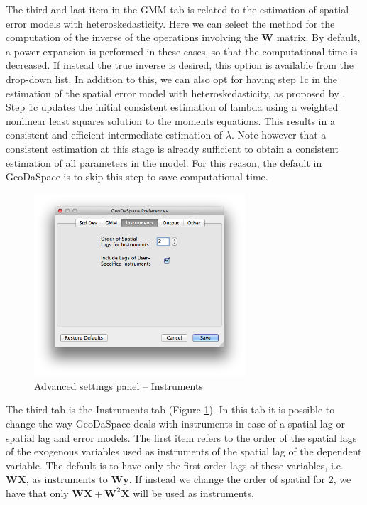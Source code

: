 \documentclass{article}
\begin{document}
The third and last item in the GMM tab is related to the estimation of spatial error models with heteroskedasticity. Here we can select the method for the computation of the inverse of the operations involving the $\mathbf{W}$ matrix. By default, a power expansion is performed in these cases, so that the computational time is decreased. If instead the true inverse is desired, this option is available from the drop-down list. In addition to this, we can also opt for having step 1c in the estimation of the spatial error model with heteroskedasticity, as proposed by \citet{Arraiz10}. Step 1c updates the initial consistent estimation of lambda using a weighted nonlinear least squares solution to the moments equations. This results in a consistent and efficient intermediate estimation of $\lambda$. Note however that a consistent estimation at this stage is already sufficient to obtain a consistent estimation of all parameters in the model. For this reason, the default in GeoDaSpace is to skip this step to save computational time.
\FloatBarrier

\begin{figure}[htb]
\centering
\includegraphics[width=0.7\textwidth]{adv_inst.png}
\caption{Advanced settings panel -- Instruments}
\label{f:adv_inst}
\end{figure}

The third tab is the Instruments tab (Figure \ref{f:adv_inst}). In this tab it is possible to change the way GeoDaSpace deals with instruments in case of a spatial lag or spatial lag and error models. The first item refers to the order of the spatial lags of the exogenous variables used as instruments of the spatial lag of the dependent variable. The default is to have only the first order lags of these variables, i.e. $\mathbf{WX}$, as instruments to $\mathbf{Wy}$. If instead we change the order of spatial for 2, we have that only $\mathbf{WX}+ \mathbf{W^2X}$ will be used as instruments. 
\end{document}
